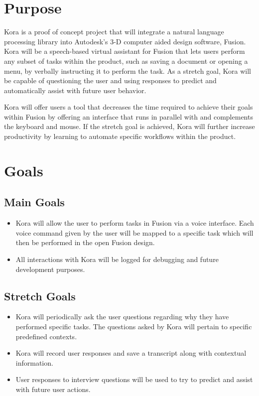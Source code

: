 \documentclass[onecolumn, draftclsnofoot,10pt, compsoc]{IEEEtran}
\begin{document}

\section{Purpose}
	Kora is a proof of concept project that will integrate a natural language processing library into Autodesk's 3-D computer aided design software, Fusion.
	Kora will be a speech-based virtual assistant for Fusion that lets users perform any subset of tasks within the product, such as saving a document or opening a menu, by verbally instructing it to perform the task.
	As a stretch goal, Kora will be capable of questioning the user and using responses to predict and automatically assist with future user behavior.
	
	Kora will offer users a tool that decreases the time required to achieve their goals within Fusion by offering an interface that runs in parallel with and complements the keyboard and mouse.
	If the stretch goal is achieved, Kora will further increase productivity by learning to automate specific workflows within the product.

\section{Goals}
	\subsection{Main Goals}
		\begin{itemize}
			 \item{
			 	Kora will allow the user to perform tasks in Fusion via a voice interface.
				Each voice command given by the user will be mapped to a specific task which will then be performed in the open Fusion design.}
			\item{
				All interactions with Kora will be logged for debugging and future development purposes.}
		\end{itemize}
	\subsection{Stretch Goals}
		\begin{itemize}
			\item{
				Kora will periodically ask the user questions regarding why they have performed specific tasks.
				The questions asked by Kora will pertain to specific predefined contexts.}
			\item{
			Kora will record user responses and save a transcript along with contextual information.}
			\item{
				User responses to interview questions will be used to try to predict and assist with future user actions.}
		\end{itemize}
\end{document}
